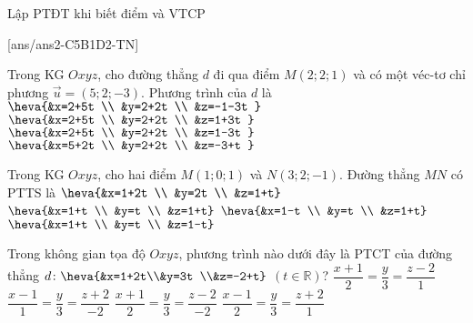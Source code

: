 \begin{dang}{Lập PTĐT khi biết điểm và VTCP}

\end{dang}
\TN
{}[ans/ans2-C5B1D2-TN]
\begin{ex}%
	Trong KG $Oxyz$, cho đường thẳng $d$ đi qua điểm $M(2; 2; 1)$ và có một véc-tơ chỉ phương $\overrightarrow{u}=(5; 2;-3)$. Phương trình của $d$ là
	\choice
	{$\heva{&x=2+5t \\
			&y=2+2t \\
			&z=-1-3t
		}$}
	{$\heva{&x=2+5t \\
			&y=2+2t \\
			&z=1+3t
		}$}
	{\True $\heva{&x=2+5t \\
			&y=2+2t \\
			&z=1-3t
		}$}
	{$\heva{&x=5+2t \\
			&y=2+2t \\
			&z=-3+t
		}$}
\end{ex}
\begin{ex}%
	Trong KG $Oxyz$, cho hai điểm $M(1; 0; 1)$ và $N(3; 2;-1)$. Đường thẳng $MN$ có PTTS là
	\choice
	{$\heva{&x=1+2t \\
			&y=2t \\
			&z=1+t}$}
	{$\heva{&x=1+t \\
			&y=t \\
			&z=1+t}$}
	{$\heva{&x=1-t \\
			&y=t \\
			&z=1+t}$}
	{\True $\heva{&x=1+t \\
			&y=t \\
			&z=1-t}$}
\end{ex}
	\begin{ex}%
		Trong không gian tọa độ $Oxyz$, phương trình nào dưới đây là PTCT của đường thẳng $d\colon\heva{&x=1+2t\\&y=3t \\&z=-2+t}$ $(t\in\mathbb{R})$?
		\choice
		{$\dfrac{x+1}{2}=\dfrac{y}{3}=\dfrac{z-2}{1}$}
		{$\dfrac{x-1}{1}=\dfrac{y}{3}=\dfrac{z+2}{-2}$}
		{$\dfrac{x+1}{2}=\dfrac{y}{3}=\dfrac{z-2}{-2}$}
		{\True $\dfrac{x-1}{2}=\dfrac{y}{3}=\dfrac{z+2}{1}$}
\end{ex}

